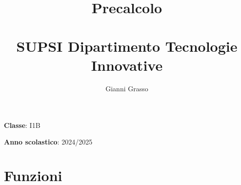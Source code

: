 \documentclass{article}
\title{
    Precalcolo \\
    \phantom{}\\
    \large SUPSI Dipartimento Tecnologie Innovative
}
\author{Gianni Grasso}
\begin{document}
\maketitle
\hphantom{ }
\vspace{14.5cm}

\textbf{Classe}: I1B

\textbf{Anno scolastico}: 2024/2025
\pagebreak


\tableofcontents
\pagebreak

\section{Funzioni}

\pagebreak
\end{document}
